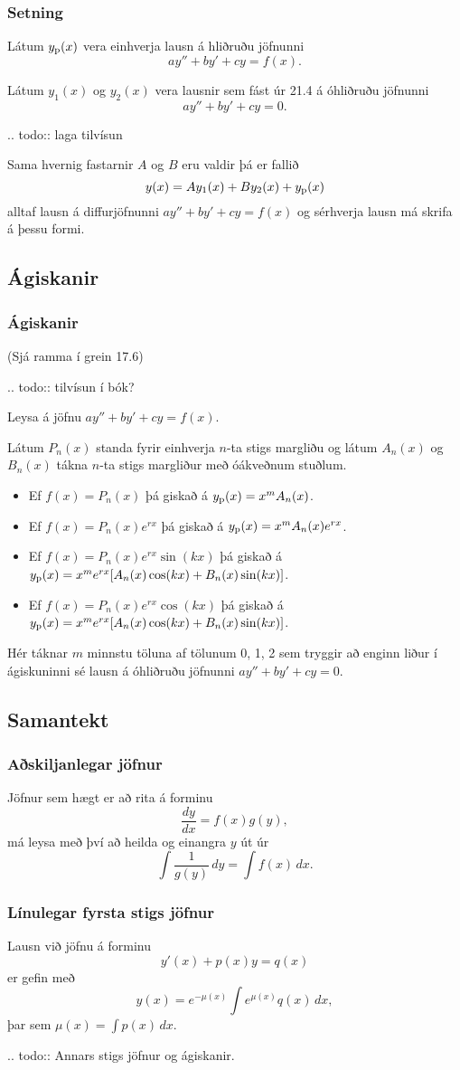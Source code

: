 \documentclass[icelandic,a4paper,12pt]{article}
\begin{document}
\subsubsection{Setning}
Látum $y_{\rm p}(x)$ vera einhverja lausn á hliðruðu jöfnunni
$$
  ay''+by'+cy=f(x).
$$ 

Látum $y_1(x)$ og $y_2(x)$ vera lausnir sem fást úr 21.4 á óhliðruðu jöfnunni
$$
ay''+by'+cy=0.
$$

.. todo::
  laga tilvísun

Sama hvernig fastarnir $A$ og $B$ eru valdir þá er fallið 
$$y(x)=Ay_1(x)+By_2(x)+y_{\rm p}(x)$$ 
alltaf lausn á diffurjöfnunni  $ay''+by'+cy=f(x)$ og sérhverja lausn
má skrifa á þessu formi.

\subsection{Ágiskanir}
\subsubsection{Ágiskanir} 
(Sjá ramma í grein 17.6)

.. todo::
  tilvísun í bók?

Leysa á jöfnu $ay''+by'+cy=f(x)$.



Látum $P_n(x)$ standa fyrir einhverja $n$-ta stigs margliðu og látum
$A_n(x)$ og $B_n(x)$ tákna $n$-ta stigs margliður með óákveðnum stuðlum. 

\begin{itemize}
\item Ef $f(x)=P_n(x)$ þá giskað á $y_{\rm p}(x)=x^mA_n(x)$.
\item Ef $f(x)=P_n(x)e^{rx}$ þá giskað á $y_{\rm p}(x)=x^mA_n(x)e^{rx}$.
\item Ef $f(x)=P_n(x)e^{rx}\sin(kx)$ 
þá giskað á $y_{\rm p}(x)=x^me^{rx}[A_n(x)\cos(kx)+B_n(x)\sin(kx)]$.
\item Ef $f(x)=P_n(x)e^{rx}\cos(kx)$ 
þá giskað á $y_{\rm p}(x)=x^me^{rx}[A_n(x)\cos(kx)+B_n(x)\sin(kx)]$.
\end{itemize} 
Hér táknar $m$ minnstu töluna af tölunum 0, 1, 2 sem tryggir að enginn
liður í ágiskuninni sé lausn á óhliðruðu jöfnunni $ay''+by'+cy=0$.


\subsection{Samantekt}
\subsubsection{Aðskiljanlegar jöfnur}
Jöfnur sem hægt er að rita á forminu
$$
\frac{dy}{dx} = f(x)g(y),
$$
má leysa með því að heilda og einangra $y$ út úr
$$
\int \frac 1{g(y)}\, dy = \int f(x)\, dx.
$$
 
\subsubsection{Línulegar fyrsta stigs jöfnur}
Lausn við jöfnu á forminu 
$$
  y'(x) + p(x)y = q(x)
$$
er gefin með 
$$
y(x) = e^{-\mu(x)} \int e^{\mu(x)} q(x)\, dx,
$$
þar sem $\mu(x) = \int p(x)\, dx$.

.. todo::
  Annars stigs jöfnur og ágiskanir.
\end{document}
